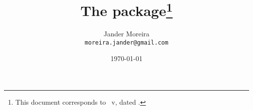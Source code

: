 \documentclass[a4paper, 11pt]{article}
\title{The \PackageName{algxpar} package\thanks{This document corresponds to \PackageName{algxpar}~v\AlgVersion, dated \AlgDate.}}
\author{Jander Moreira\\\texttt{moreira.jander@gmail.com}}
\date{\today}
\begin{document}
\maketitle
\sloppy

%
%
%
%
%
%
%
%
%
%
\end{document}
